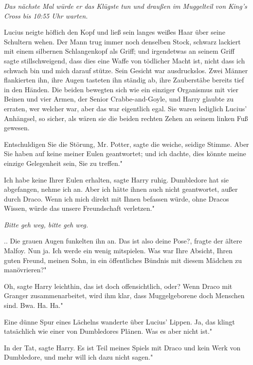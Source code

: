 \emph{Das nächste Mal würde er das Klügste tun und draußen im Muggelteil von
King's Cross bis 10:55 Uhr warten.}

Lucius neigte höflich den Kopf und ließ sein langes weißes Haar über seine
Schultern wehen. Der Mann trug immer noch denselben Stock, schwarz lackiert mit
einem silbernen Schlangenkopf als Griff; und irgendetwas an seinem Griff sagte
stillschweigend, dass dies eine Waffe von tödlicher Macht ist, nicht dass ich
schwach bin und mich darauf stütze. Sein Gesicht war ausdruckslos. Zwei Männer
flankierten ihn, ihre Augen tasteten ihn ständig ab, ihre Zauberstäbe bereits
tief in den Händen. Die beiden bewegten sich wie ein einziger Organismus mit
vier Beinen und vier Armen, der Senior Crabbe-and-Goyle, und Harry glaubte zu
erraten, wer welcher war, aber das war eigentlich egal. Sie waren lediglich
Lucius' Anhängsel, so sicher, als wären sie die beiden rechten Zehen an seinem
linken Fuß gewesen.

\glqq{}Entschuldigen Sie die Störung, Mr. Potter\grqq{}, sagte die weiche,
seidige Stimme. \glqq{}Aber Sie haben auf keine meiner Eulen geantwortet; und
ich dachte, dies könnte meine einzige Gelegenheit sein, Sie zu treffen."

\glqq{}Ich habe keine Ihrer Eulen erhalten\grqq{}, sagte Harry ruhig. \glqq{}
Dumbledore hat sie abgefangen, nehme ich an. Aber ich hätte ihnen auch nicht
geantwortet, außer durch Draco. Wenn ich mich direkt mit Ihnen befassen würde,
ohne Dracos Wissen, würde das unsere Freundschaft verletzen."

\emph{Bitte geh weg, bitte geh weg.}

.. Die grauen Augen funkelten ihn an. \glqq{}Das ist also deine Pose?\grqq{},
fragte der ältere Malfoy. \glqq{}Nun ja. Ich werde ein wenig mitspielen. Was war
Ihre Absicht, Ihren guten Freund, meinen Sohn, in ein öffentliches Bündnis mit
diesem Mädchen zu manövrieren?"

\glqq{}Oh\grqq{}, sagte Harry leichthin, \glqq{}das ist doch offensichtlich,
oder? Wenn Draco mit Granger zusammenarbeitet, wird ihm klar, dass
Muggelgeborene doch Menschen sind. Bwa. Ha. Ha."

Eine dünne Spur eines Lächelns wanderte über Lucius' Lippen. \glqq{}Ja, das
klingt tatsächlich wie einer von Dumbledores Plänen. Was es aber nicht ist."

\glqq{}In der Tat\grqq{}, sagte Harry. \glqq{}Es ist Teil meines Spiels mit
Draco und kein Werk von Dumbledore, und mehr will ich dazu nicht sagen."

